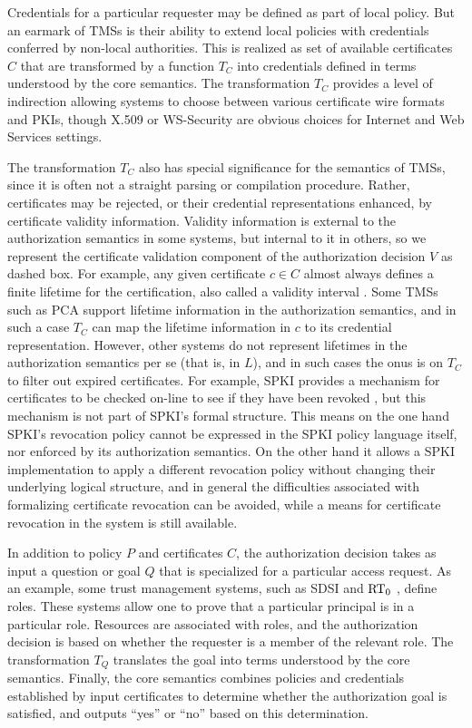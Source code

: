 Credentials for a particular requester may be defined as part of local
policy. But an earmark of TMSs is their ability to extend local policies
with credentials conferred by non-local authorities. This is realized as
set of available certificates $C$ that are transformed by a function $T_C$
into credentials defined in terms understood by the core semantics. The
transformation $T_C$ provides a level of indirection allowing systems to
choose between various certificate wire formats and PKIs, though X.509
\cite{X509} or WS-Security \cite{OASIS:WSSTC} are obvious choices for
Internet and Web Services settings.


\tmstructfig

The transformation $T_C$ also has special significance for the
semantics of TMSs, since it is often not a straight parsing or
compilation procedure.  Rather, certificates may be rejected, or their
credential representations enhanced, by certificate validity
information.  Validity information is external to the authorization
semantics in some systems, but internal to it in others, so we
represent the certificate validation component of the authorization
decision $V$ as dashed box.  For example, any given certificate $c \in
C$ almost always defines a finite lifetime for the certification, also
called a validity interval \cite{winslett-adl97}. Some TMSs such as
PCA \cite{Bauer:GFACSW} support lifetime information in the
authorization semantics, and in such a case $T_C$ can map the lifetime
information in $c$ to its credential representation. However, other
systems do not represent lifetimes in the authorization semantics per
se (that is, in $L$), and in such cases the onus is on $T_C$ to filter
out expired certificates.  For example, SPKI provides a mechanism for
certificates to be checked on-line to see if they have been revoked
\cite{RFC-2693}, but this mechanism is not part of SPKI's formal
structure. This means on the one hand SPKI's revocation policy cannot
be expressed in the SPKI policy language itself, nor enforced by its
authorization semantics. On the other hand it allows a SPKI
implementation to apply a different revocation policy without changing
their underlying logical structure, and in general the difficulties
associated with formalizing certificate revocation
\cite{Stubblebine:RSAERDS,Stubblebine:ALSSRR,Rivest:CWECRL} can be
avoided, while a means for certificate revocation in the system is
still available.

In addition to policy $P$ and certificates $C$, the authorization decision
takes as input a question or goal $Q$ that is specialized for a particular
access request. As an example, some trust management systems, such as SDSI and
$\text{RT}_0$ \cite{Li:DRBTMF,Li:RRBTMF}, define roles. These systems allow one to
prove that a particular principal is in a particular role. Resources are
associated with roles, and the authorization decision is based on whether the
requester is a member of the relevant role. The transformation $T_Q$
translates the goal into terms understood by the core semantics. Finally, the
core semantics combines policies and credentials established by input
certificates to determine whether the authorization goal is satisfied, and
outputs ``yes'' or ``no'' based on this determination.

